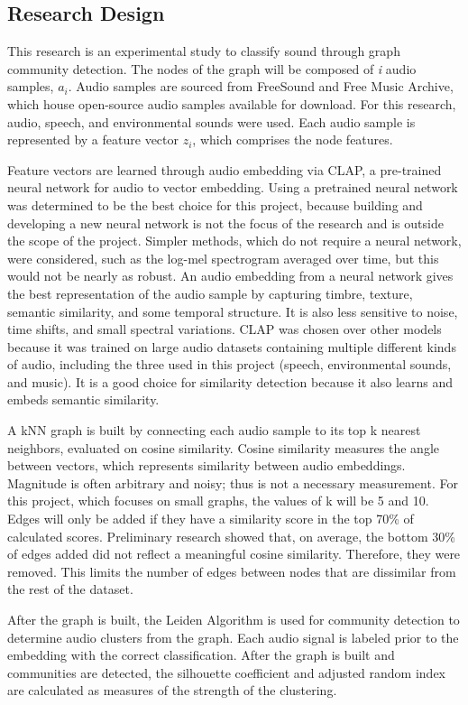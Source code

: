\documentclass{article}
\begin{document}
\subsection{Research Design}
This research is an experimental study to classify sound through graph community detection. The nodes of the graph will be composed of \textit{i} audio samples, $a_i$. Audio samples are sourced from FreeSound and Free Music Archive, which house open-source audio samples available for download. For this research, audio, speech, and environmental sounds were used. Each audio sample is represented by a feature vector $z_i$, which comprises the node features. 

Feature vectors are learned through audio embedding via CLAP, a pre-trained neural network for audio to vector embedding. Using a pretrained neural network was determined to be the best choice for this project, because building and developing a new neural network is not the focus of the research and is outside the scope of the project. Simpler methods, which do not require a neural network, were considered, such as the log-mel spectrogram averaged over time, but this would not be nearly as robust. An audio embedding from a neural network gives the best representation of the audio sample by capturing timbre, texture, semantic similarity, and some temporal structure. It is also less sensitive to noise, time shifts, and small spectral variations. CLAP was chosen over other models because it was trained on large audio datasets containing multiple different kinds of audio, including the three used in this project (speech, environmental sounds, and music). It is a good choice for similarity detection because it also learns and embeds semantic similarity.

A kNN graph is built by connecting each audio sample to its top k nearest neighbors, evaluated on cosine similarity. Cosine similarity measures the angle between vectors, which represents similarity between audio embeddings. Magnitude is often arbitrary and noisy; thus is not a necessary measurement. For this project, which focuses on small graphs, the values of k will be 5 and 10. Edges will only be added if they have a similarity score in the top 70\% of calculated scores. Preliminary research showed that, on average, the bottom 30\% of edges added did not reflect a meaningful cosine similarity. Therefore, they were removed. This limits the number of edges between nodes that are dissimilar from the rest of the dataset. 

After the graph is built, the Leiden Algorithm is used for community detection to determine audio clusters from the graph. Each audio signal is labeled prior to the embedding with the correct classification. After the graph is built and communities are detected, the silhouette coefficient and adjusted random index are calculated as measures of the strength of the clustering.
\end{document}
